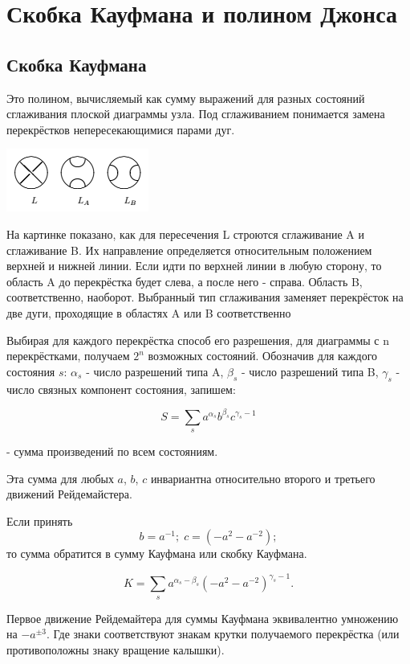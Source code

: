 \section{Скобка Кауфмана и полином Джонса}

\subsection{Скобка Кауфмана}

Это полином, вычисляемый как сумму выражений для разных состояний сглаживания плоской диаграммы узла.
Под сглаживанием понимается замена перекрёстков непересекающимися парами дуг.

\graphicspath{{\currentpath}}

\includegraphics{images/resolve-cross.png}

На картинке показано, как для пересечения L строются сглаживание A и сглаживание B. Их направление определяется относительным положением верхней и нижней линии. Если идти по верхней линии в любую сторону, то область A до перекрёстка будет слева, а после него - справа. Область B, соответственно, наоборот. Выбранный тип сглаживания заменяет перекрёсток на две дуги, проходящие в областях A или B соответственно

Выбирая для каждого перекрёстка способ его разрешения, для диаграммы с n перекрёстками, получаем $2^n$ возможных состояний.
Обозначив для каждого состояния $s$: $\alpha_s$ - число разрешений типа A, $\beta_s$ - число разрешений типа B, $\gamma_s$ - число связных компонент состояния,
запишем:

$$S = \sum_{s} a^{\alpha_s} b^{\beta_s} c^{\gamma_s - 1}$$

- сумма произведений по всем состояниям.

Эта сумма для любых $a$, $b$, $c$ инвариантна относительно второго и третьего движений Рейдемайстера.

Если принять
$$b = a^{-1};\; c = \left(-a^2 - a^{-2}\right);$$
то сумма обратится в сумму Кауфмана или скобку Кауфмана.

$$K = \sum_{s} a^{\alpha_s - \beta_s} \left(-a^2 - a^{-2}\right)^{\gamma_s - 1}.$$

Первое движение Рейдемайтера для суммы Кауфмана эквивалентно умножению на $-a^{\pm 3}$. Где знаки соответствуют знакам крутки получаемого перекрёстка (или противоположны знаку вращение калышки).

